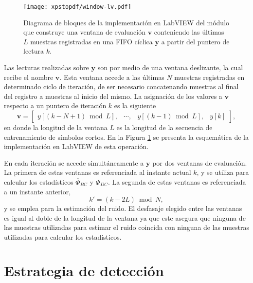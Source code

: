 \begin{figure}[t]
    \centering{}\texttt{[image: xpstopdf/window-lv.pdf]}
    \caption[Implementación en LabVIEW del módulo que obtiene una ventana de evaluación sobre una FIFO cíclica.]{Diagrama de bloques de la implementación en LabVIEW del módulo que construye una ventana de evaluación $\mathbf{v}$ conteniendo las últimas $L$ muestras registradas en una FIFO cíclica $\mathbf{y}$ a partir del puntero de lectura $k$.\label{fig:window-select-lv}}  
\end{figure}

Las lecturas realizadas sobre $\mathbf{y}$ son por medio de una ventana deslizante, la cual recibe el nombre $\mathbf{v}$. Esta ventana accede a las últimas $N$ muestras registradas en determinado ciclo de iteración, de ser necesario concatenando muestras al final del registro a muestras al inicio del mismo. La asignación de los valores a $\mathbf{v}$ respecto a un puntero de iteración $k$ es la siguiente
\begin{equation}
    \mathbf{v} = \begin{bmatrix}
        y\left[(k-N+1) \bmod L\right], & \cdots, &  y\left[(k-1) \bmod L\right], & y[k]
    \end{bmatrix},
\end{equation}
en donde la longitud de la ventana $L$ es la longitud de la secuencia de entrenamiento de símbolos cortos. En la Figura \ref{fig:window-select-lv} se presenta la esquemática de la implementación en LabVIEW de esta operación. 

En cada iteración se accede simultáneamente a $\mathbf{y}$ por dos ventanas de evaluación. La primera de estas ventanas es referenciada al instante actual $k$, y se utiliza para calcular los estadísticos $\overline{\Phi}_{BC}$ y $\Phi_{DC}$. La segunda de estas ventanas es referenciada a un instante anterior,
\begin{equation}
    k' = (k-2L) \bmod N,
\end{equation}
y se emplea para la estimación del ruido. El desfasaje elegido entre las ventanas es igual al doble de la longitud de la ventana ya que este asegura que ninguna de las muestras utilizadas para estimar el ruido coincida con ninguna de las muestras utilizadas para calcular los estadísticos.


\section{Estrategia de detección}
\label{S:ch5-detección}


